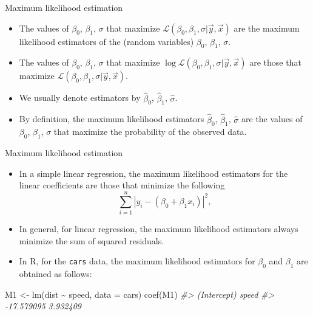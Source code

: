 \documentclass[
  10pt,
  ignorenonframetext,
]{beamer}
\newenvironment{Shaded}{\begin{snugshade}}{\end{snugshade}}
\newcommand{\AttributeTok}[1]{\textcolor[rgb]{0.77,0.63,0.00}{#1}}
\newcommand{\CommentTok}[1]{\textcolor[rgb]{0.56,0.35,0.01}{\textit{#1}}}
\newcommand{\FunctionTok}[1]{\textcolor[rgb]{0.00,0.00,0.00}{#1}}
\newcommand{\NormalTok}[1]{#1}
\newcommand{\OtherTok}[1]{\textcolor[rgb]{0.56,0.35,0.01}{#1}}
\newcommand{\SpecialCharTok}[1]{\textcolor[rgb]{0.00,0.00,0.00}{#1}}
\newcommand*{\given}{\vert}
\begin{document}
\begin{frame}{Maximum likelihood estimation}
\protect\hypertarget{maximum-likelihood-estimation}{}
\begin{itemize}
\item
  The values of \(\beta_0\), \(\beta_1\), \(\sigma\) that maximize
  \(\mathcal{L}(\beta_0, \beta_1, \sigma \given \vec{y}, \vec{x})\) are
  the maximum likelihood estimators of the (random variables)
  \(\beta_0\), \(\beta_1\), \(\sigma\).
\item
  The values of \(\beta_0\), \(\beta_1\), \(\sigma\) that maximize
  \(\log \mathcal{L}(\beta_0, \beta_1, \sigma \given \vec{y}, \vec{x})\)
  are those that maximize
  \(\mathcal{L}(\beta_0, \beta_1, \sigma \given \vec{y}, \vec{x})\).
\item
  We usually denote estimators by \(\hat{\beta}_0\), \(\hat{\beta}_1\),
  \(\hat{\sigma}\).
\item
  By definition, the maximum likelihood estimators \(\hat{\beta}_0\),
  \(\hat{\beta}_1\), \(\hat{\sigma}\) are the values of \(\beta_0\),
  \(\beta_1\), \(\sigma\) that maximize the probability of the observed
  data.
\end{itemize}
\end{frame}

\begin{frame}[fragile]{Maximum likelihood estimation}
\protect\hypertarget{maximum-likelihood-estimation-1}{}
\begin{itemize}
\item
  In a simple linear regression, the maximum likelihood estimators for
  the linear coefficients are those that minimize the following \[
  \sum_{i=1}^n |y_i - (\beta_0 + \beta_1 x_i)|^2,
  \]
\item
  In general, for linear regression, the maximum likelihood estimators
  always minimize the sum of squared residuals.
\item
  In R, for the \texttt{cars} data, the maximum likelihood estimators
  for \(\beta_0\) and \(\beta_1\) are obtained as follows:
\end{itemize}

\begin{Shaded}
\begin{Highlighting}[]
\NormalTok{M1 }\OtherTok{\textless{}{-}} \FunctionTok{lm}\NormalTok{(dist }\SpecialCharTok{\textasciitilde{}}\NormalTok{ speed, }\AttributeTok{data =}\NormalTok{ cars)}
\FunctionTok{coef}\NormalTok{(M1)}
\CommentTok{\#\textgreater{} (Intercept)       speed }
\CommentTok{\#\textgreater{}  {-}17.579095    3.932409}
\end{Highlighting}
\end{Shaded}
\end{frame}
\end{document}
